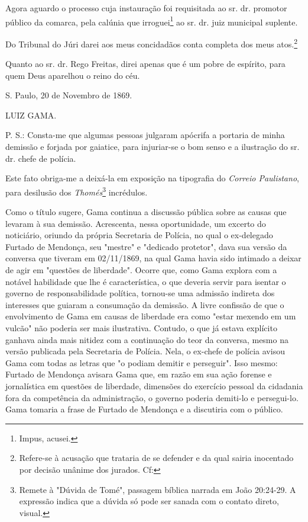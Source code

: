 Agora aguardo o processo cuja instauração foi requisitada ao sr. dr.
promotor público da comarca, pela calúnia que irroguei\footnote{Impus,
  acusei.} ao sr. dr. juiz municipal suplente.

Do Tribunal do Júri darei aos meus concidadãos conta completa dos meus
atos.\footnote{Refere-se à acusação que trataria de se defender e da
  qual sairia inocentado por decisão unânime dos jurados. Cf:}

Quanto ao sr. dr. Rego Freitas, direi apenas que é um pobre de espírito,
para quem Deus aparelhou o reino do céu.

S. Paulo, 20 de Novembro de 1869.

LUIZ GAMA.

P. S.: Consta-me que algumas pessoas julgaram apócrifa a portaria de
minha demissão e forjada por gaiatice, para injuriar-se o bom senso e a
ilustração do sr. dr. chefe de polícia.

Este fato obriga-me a deixá-la em exposição na tipografia do
\emph{Correio Paulistano}, para desilusão dos \emph{Thomés}\footnote{
  Remete à "Dúvida de Tomé", passagem bíblica narrada em João 20:24-29.
  A expressão indica que a dúvida só pode ser sanada com o contato
  direto, visual.}
incrédulos.

\pagebreak
\mbox{}\vfill
\thispagestyle{empty}

{\small\noindent
Como o título sugere, Gama continua a discussão pública sobre as
causas que levaram à sua demissão. Acrescenta, nessa oportunidade, um
excerto do noticiário, oriundo da própria Secretaria de Polícia, no qual
o ex-delegado Furtado de Mendonça, seu "mestre" e "dedicado protetor",
dava sua versão da conversa que tiveram em 02/11/1869, na qual Gama
havia sido intimado a deixar de agir em "questões de liberdade". Ocorre
que, como Gama explora com a notável habilidade que lhe é
característica, o que deveria servir para isentar o governo de
responsabilidade política, tornou-se uma admissão indireta dos
interesses que guiaram a consumação da demissão. A livre confissão de
que o envolvimento de Gama em causas de liberdade era como "estar
mexendo em um vulcão" não poderia ser mais ilustrativa. Contudo, o que
já estava explícito ganhava ainda mais nitidez com a continuação do teor
da conversa, mesmo na versão publicada pela Secretaria de Polícia. Nela,
o ex-chefe de polícia avisou Gama com todas as letras que "o podiam
demitir e perseguir". Isso mesmo: Furtado de Mendonça avisara Gama que,
em razão em sua ação forense e jornalística em questões de liberdade,
dimensões do exercício pessoal da cidadania fora da competência da
administração, o governo poderia demiti-lo e persegui-lo. Gama tomaria a
frase de Furtado de Mendonça e a discutiria com o público.}

